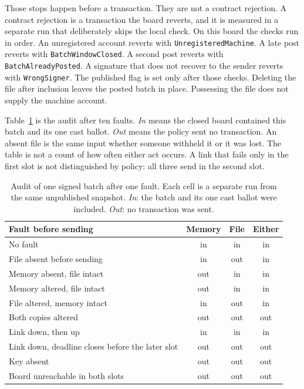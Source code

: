 \documentclass[11pt]{article}
\begin{document}
Those stops happen before a transaction. They are not a contract rejection. A contract rejection is a transaction the board reverts, and it is measured in a separate run that deliberately skips the local check. On this board the checks run in order. An unregistered account reverts with \texttt{UnregisteredMachine}. A late post reverts with \texttt{BatchWindowClosed}. A second post reverts with \texttt{BatchAlreadyPosted}. A signature that does not recover to the sender reverts with \texttt{WrongSigner}. The published flag is set only after those checks. Deleting the file after inclusion leaves the posted batch in place. Possessing the file does not supply the machine account.

Table~\ref{tab:paths} is the audit after ten faults. \emph{In} means the closed board contained this batch and its one cast ballot. \emph{Out} means the policy sent no transaction. An absent file is the same input whether someone withheld it or it was lost. The table is not a count of how often either act occurs. A link that fails only in the first slot is not distinguished by policy: all three send in the second slot.

\begin{table}[ht]
\centering
\caption{Audit of one signed batch after one fault. Each cell is a separate run from the same unpublished snapshot. \emph{In}: the batch and its one cast ballot were included. \emph{Out}: no transaction was sent.}
\label{tab:paths}
\small
\begin{tabular}{@{}>{\raggedright\arraybackslash}p{}ccc@{}}
\toprule
Fault before sending & Memory & File & Either \\
\midrule
No fault & in & in & in \\
File absent before sending & in & out & in \\
Memory absent, file intact & out & in & in \\
Memory altered, file intact & out & in & in \\
File altered, memory intact & in & out & in \\
Both copies altered & out & out & out \\
Link down, then up & in & in & in \\
Link down, deadline closes before the later slot & out & out & out \\
Key absent & out & out & out \\
Board unreachable in both slots & out & out & out \\
\bottomrule
\end{tabular}
\end{table}
\end{document}
